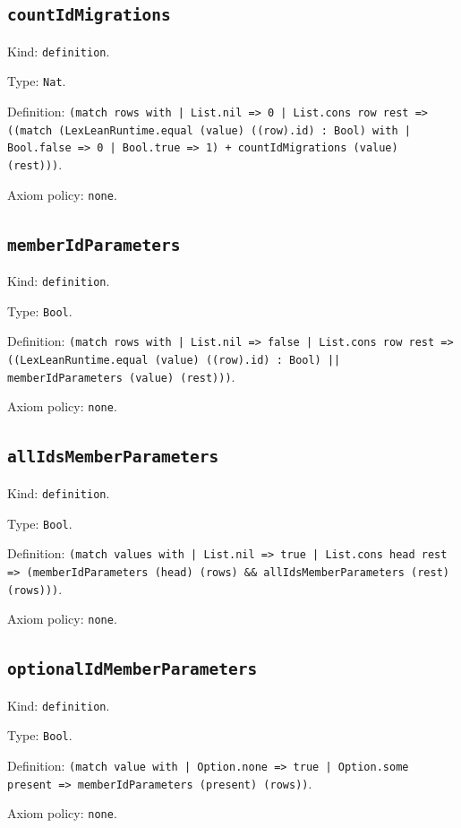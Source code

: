 \documentclass[11pt]{article}
\begin{document}
\subsection*{\texttt{countIdMigrations}}
\noindent Kind: \texttt{definition}.\par
\noindent Type: \texttt{Nat}.\par
\noindent Definition: \texttt{(match rows with | List.nil => 0 | List.cons row rest => ((match (LexLeanRuntime.equal (value) ((row).id) : Bool) with | Bool.false => 0 | Bool.true => 1) + countIdMigrations (value) (rest)))}.\par
\noindent Axiom policy: \texttt{none}.\par
\subsection*{\texttt{memberIdParameters}}
\noindent Kind: \texttt{definition}.\par
\noindent Type: \texttt{Bool}.\par
\noindent Definition: \texttt{(match rows with | List.nil => false | List.cons row rest => ((LexLeanRuntime.equal (value) ((row).id) : Bool) || memberIdParameters (value) (rest)))}.\par
\noindent Axiom policy: \texttt{none}.\par
\subsection*{\texttt{allIdsMemberParameters}}
\noindent Kind: \texttt{definition}.\par
\noindent Type: \texttt{Bool}.\par
\noindent Definition: \texttt{(match values with | List.nil => true | List.cons head rest => (memberIdParameters (head) (rows) \&\& allIdsMemberParameters (rest) (rows)))}.\par
\noindent Axiom policy: \texttt{none}.\par
\subsection*{\texttt{optionalIdMemberParameters}}
\noindent Kind: \texttt{definition}.\par
\noindent Type: \texttt{Bool}.\par
\noindent Definition: \texttt{(match value with | Option.none => true | Option.some present => memberIdParameters (present) (rows))}.\par
\noindent Axiom policy: \texttt{none}.\par
\end{document}

